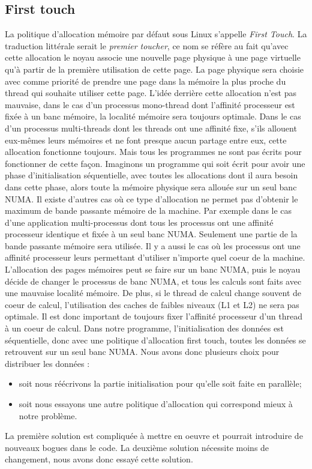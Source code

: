 \subsection{First touch}
La politique d'allocation mémoire par défaut sous Linux s'appelle {\em First Touch}.
%
La traduction littérale serait le {\em premier toucher}, ce nom se réfère au fait qu'avec cette allocation le noyau associe une nouvelle page physique à une page virtuelle qu'à partir de la première utilisation de cette page.
%
La page physique sera choisie avec comme priorité de prendre une page dans la mémoire la plus proche du thread qui souhaite utiliser cette page.
%
L'idée derrière cette allocation n'est pas mauvaise, dans le cas d'un processus mono-thread dont l'affinité processeur est fixée à un banc mémoire, la localité mémoire sera toujours optimale.
%
Dans le cas d'un processus multi-threads dont les threads ont une affinité fixe, s'ils allouent eux-mêmes leurs mémoires et ne font presque aucun partage entre eux, cette allocation fonctionne toujours.
%
Mais tous les programmes ne sont pas écrits pour fonctionner de cette façon.
%
Imaginons un programme qui soit écrit pour avoir une phase d'initialisation séquentielle, avec toutes les allocations dont il aura besoin dans cette phase, alors toute la mémoire physique sera allouée sur un seul banc NUMA.
%
Il existe d'autres cas où ce type d'allocation ne permet pas d'obtenir le maximum de bande passante mémoire de la machine.
%
Par exemple dans le cas d'une application multi-processus dont tous les processus ont une affinité processeur identique et fixée à un seul banc NUMA.
%
Seulement une partie de la bande passante mémoire sera utilisée.
%
Il y a aussi le cas où les processus ont une affinité processeur leurs permettant d'utiliser n'importe quel coeur de la machine.
%
L'allocation des pages mémoires peut se faire sur un banc NUMA, puis le noyau décide de changer le processus de banc NUMA, et tous les calculs sont faits avec une mauvaise localité mémoire.
%
De plus, si le thread de calcul change souvent de coeur de calcul, l'utilisation des caches de faibles niveaux (L1 et L2) ne sera pas optimale.
%
Il est donc important de toujours fixer l'affinité processeur d'un thread à un coeur de calcul.
%
Dans notre programme, l'initialisation des données est séquentielle, donc avec une politique d'allocation first touch, toutes les données se retrouvent sur un seul banc NUMA.
%
Nous avons donc plusieurs choix pour distribuer les données :
\begin{itemize}
  \item soit nous réécrivons la partie initialisation pour qu'elle soit faite en parallèle;
  \item soit nous essayons une autre politique d'allocation qui correspond mieux à notre problème.
\end{itemize}
%
La première solution est compliquée à mettre en oeuvre et pourrait introduire de nouveaux bogues dans le code.
%
La deuxième solution nécessite moins de changement, nous avons donc essayé cette solution.
